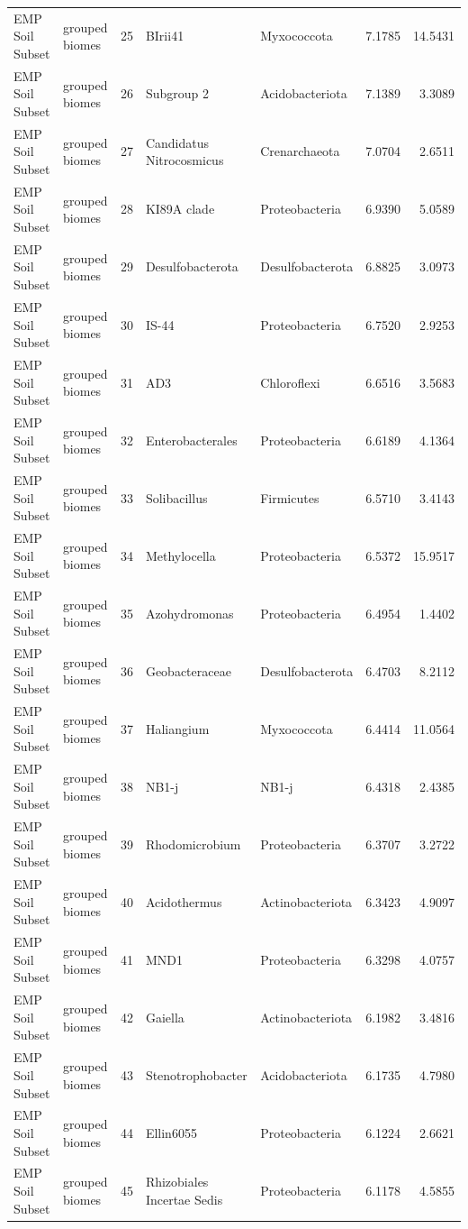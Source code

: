 \documentclass[12pt, oneside]{report}
\begin{document}
\begin{center}
\begin{longtable}{llrp{2.7cm}p{2.2cm}rr}
EMP Soil Subset & grouped biomes & 25 & BIrii41 & Myxococcota & 7.1785 & 14.5431 \\
EMP Soil Subset & grouped biomes & 26 & Subgroup 2 & Acidobacteriota & 7.1389 & 3.3089 \\
EMP Soil Subset & grouped biomes & 27 & Candidatus Nitrocosmicus & Crenarchaeota & 7.0704 & 2.6511 \\
EMP Soil Subset & grouped biomes & 28 & KI89A clade & Proteobacteria & 6.9390 & 5.0589 \\
EMP Soil Subset & grouped biomes & 29 & Desulfobacterota & Desulfobacterota & 6.8825 & 3.0973 \\
EMP Soil Subset & grouped biomes & 30 & IS-44 & Proteobacteria & 6.7520 & 2.9253 \\
EMP Soil Subset & grouped biomes & 31 & AD3 & Chloroflexi & 6.6516 & 3.5683 \\
EMP Soil Subset & grouped biomes & 32 & Enterobacterales & Proteobacteria & 6.6189 & 4.1364 \\
EMP Soil Subset & grouped biomes & 33 & Solibacillus & Firmicutes & 6.5710 & 3.4143 \\
EMP Soil Subset & grouped biomes & 34 & Methylocella & Proteobacteria & 6.5372 & 15.9517 \\
EMP Soil Subset & grouped biomes & 35 & Azohydromonas & Proteobacteria & 6.4954 & 1.4402 \\
EMP Soil Subset & grouped biomes & 36 & Geobacteraceae & Desulfobacterota & 6.4703 & 8.2112 \\
EMP Soil Subset & grouped biomes & 37 & Haliangium & Myxococcota & 6.4414 & 11.0564 \\
EMP Soil Subset & grouped biomes & 38 & NB1-j & NB1-j & 6.4318 & 2.4385 \\
EMP Soil Subset & grouped biomes & 39 & Rhodomicrobium & Proteobacteria & 6.3707 & 3.2722 \\
EMP Soil Subset & grouped biomes & 40 & Acidothermus & Actinobacteriota & 6.3423 & 4.9097 \\
EMP Soil Subset & grouped biomes & 41 & MND1 & Proteobacteria & 6.3298 & 4.0757 \\
EMP Soil Subset & grouped biomes & 42 & Gaiella & Actinobacteriota & 6.1982 & 3.4816 \\
EMP Soil Subset & grouped biomes & 43 & Stenotrophobacter & Acidobacteriota & 6.1735 & 4.7980 \\
EMP Soil Subset & grouped biomes & 44 & Ellin6055 & Proteobacteria & 6.1224 & 2.6621 \\
EMP Soil Subset & grouped biomes & 45 & Rhizobiales Incertae Sedis & Proteobacteria & 6.1178 & 4.5855 \\

\end{longtable}
\end{center}
\end{document}

